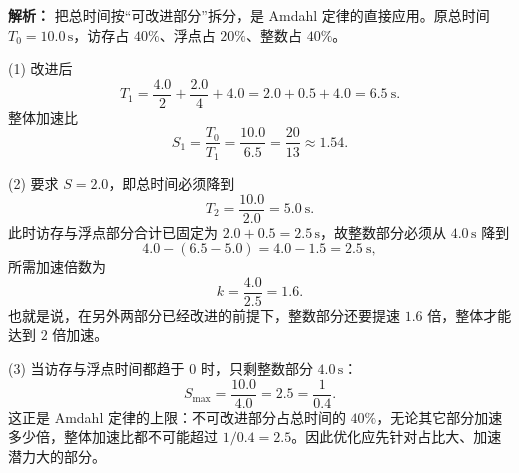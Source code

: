 \begin{enumerate}
\ifshowsolutions\par\noindent\textbf{解析：} 把总时间按“可改进部分”拆分，是 Amdahl 定律的直接应用。原总时间 $T_0=10.0\,\mathrm{s}$，访存占 $40\%$、浮点占 $20\%$、整数占 $40\%$。

(1) 改进后
\[
T_1=\frac{4.0}{2}+\frac{2.0}{4}+4.0=2.0+0.5+4.0=6.5\ \mathrm{s}.
\]
整体加速比
\[
S_1=\frac{T_0}{T_1}=\frac{10.0}{6.5}=\frac{20}{13}\approx1.54.
\]

(2) 要求 $S=2.0$，即总时间必须降到
\[
T_2=\frac{10.0}{2.0}=5.0\ \mathrm{s}.
\]
此时访存与浮点部分合计已固定为 $2.0+0.5=2.5\,\mathrm{s}$，故整数部分必须从 $4.0\,\mathrm{s}$ 降到
\[
4.0-(6.5-5.0)=4.0-1.5=2.5\ \mathrm{s},
\]
所需加速倍数为
\[
k=\frac{4.0}{2.5}=1.6.
\]
也就是说，在另外两部分已经改进的前提下，整数部分还要提速 $1.6$ 倍，整体才能达到 $2$ 倍加速。

(3) 当访存与浮点时间都趋于 $0$ 时，只剩整数部分 $4.0\,\mathrm{s}$：
\[
S_{\max}=\frac{10.0}{4.0}=2.5=\frac{1}{0.4}.
\]
这正是 Amdahl 定律的上限：不可改进部分占总时间的 $40\%$，无论其它部分加速多少倍，整体加速比都不可能超过 $1/0.4=2.5$。因此优化应先针对占比大、加速潜力大的部分。

\par\noindent{}\par\noindent{}\else \answerarea[10] \fi

\end{enumerate}

\vspace{8pt}
